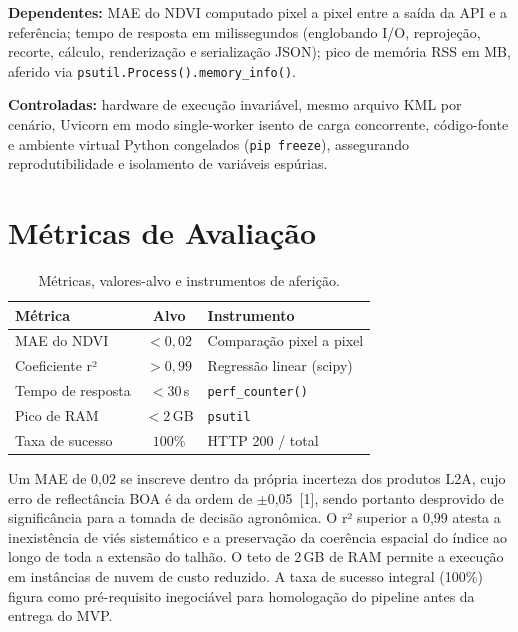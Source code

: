 \documentclass[10pt, a4paper, twocolumn]{article}
\begin{document}
\textbf{Dependentes:} MAE do NDVI computado pixel a pixel entre a saída da API e a referência; tempo de resposta em milissegundos (englobando I/O, reprojeção, recorte, cálculo, renderização e serialização JSON); pico de memória RSS em MB, aferido via \texttt{psutil.Process().memory\_info()}.

\textbf{Controladas:} hardware de execução invariável, mesmo arquivo KML por cenário, Uvicorn em modo single-worker isento de carga concorrente, código-fonte e ambiente virtual Python congelados (\texttt{pip freeze}), assegurando reprodutibilidade e isolamento de variáveis espúrias.

\section{Métricas de Avaliação}

\begin{table}[H]
\centering
\caption{Métricas, valores-alvo e instrumentos de aferição.}
\label{tab:metricas}
\footnotesize
\setlength{\tabcolsep}{3pt}
\begin{tabular}{@{}lcp{3.0cm}@{}}
\toprule
\textbf{Métrica} & \textbf{Alvo} & \textbf{Instrumento} \\
\midrule
MAE do NDVI & $<0{,}02$ & Comparação pixel a pixel \\
Coeficiente r² & $>0{,}99$ & Regressão linear (scipy) \\
Tempo de resposta & $<30$\,s & \texttt{perf\_counter()} \\
Pico de RAM & $<2$\,GB & \texttt{psutil} \\
Taxa de sucesso & $100\%$ & HTTP 200 / total \\
\bottomrule
\end{tabular}
\end{table}

Um MAE de 0,02 se inscreve dentro da própria incerteza dos produtos L2A, cujo erro de reflectância BOA é da ordem de $\pm$0,05~[1], sendo portanto desprovido de significância para a tomada de decisão agronômica. O r² superior a 0,99 atesta a inexistência de viés sistemático e a preservação da coerência espacial do índice ao longo de toda a extensão do talhão. O teto de 2\,GB de RAM permite a execução em instâncias de nuvem de custo reduzido. A taxa de sucesso integral (100\%) figura como pré-requisito inegociável para homologação do pipeline antes da entrega do MVP.
\end{document}
